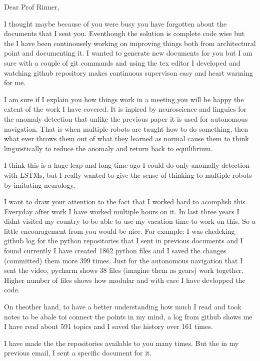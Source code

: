 \documentclass[a4paper]{article}
\title{}
\date{}
\author{Mohammad Rahmani}
\begin{document}
   \maketitle

   Dear Prof Rinner,

   I thought maybe because of you were busy you have forgotten about the documents that I sent you.
   Eventhough the solution is complete code wise but the I have been continousely working on  improving things both from architectural point and documenting it. I wanted to generate new documents for you but I am sure with a couple of git commands and using the tex editor I developed and watching github repository makes continuous supervison easy and heart warming for me.

   I am sure if I explain you how things work in a meeting,you will be happy the extent of the work I have covered. It is inpired by neuroscience and linguics for the anomaly detection that unlike the previous paper it is used for autonomous navigation. That is when multiple robots are taught how to do something, then what ever throws them out of what they learned as normal cause them to think linguistically to reduce the anomaly and return back to equilibrium.

   I think this is a huge leap and long time ago I could do only anomally detection with LSTMs, but I really wanted to give the sense of thinking to multiple robots by imitating neurology.

   I want to draw your attention to the fact that I worked hard to acomplish this. Everyday after work I have worked multiple hours on it. In last three years I didnt visited my country to be able to use my vacation time to work on this. So a little encouragement from you would be nice. For example: I was chedcking github log for the python repositories that I sent in previous documents and I found currently I have created 1862 python files and I saved the changes (committed) them more 399 times. Just for the autonomous navigation that I sent the video, pycharm shows 38 files (imagine them as gears) work together. Higher number of files shows how modular and with care I have devlopped the code.

   On theother hand, to have a better understanding how much I read and took notes to be abale toi connect the points in my mind, a log from github shows me I have read about 591 topics and I saved the history over 161 times.

   I have made the the repositories available to you many times. But the in my previous email, I sent a specific document for it.
\end{document}
